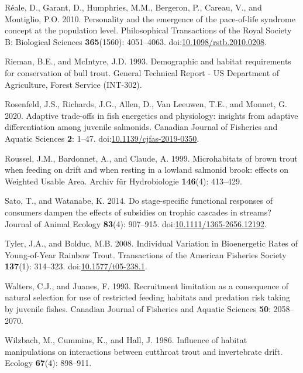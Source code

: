 \documentclass[]{article}
\begin{document}
\hypertarget{ref-Reale2010}{}
Réale, D., Garant, D., Humphries, M.M., Bergeron, P., Careau, V., and
Montiglio, P.O. 2010. Personality and the emergence of the pace-of-life
syndrome concept at the population level. Philosophical Transactions of
the Royal Society B: Biological Sciences \textbf{365}(1560): 4051--4063.
doi:\href{https://doi.org/10.1098/rstb.2010.0208}{10.1098/rstb.2010.0208}.

\hypertarget{ref-Rieman1993a}{}
Rieman, B.E., and McIntyre, J.D. 1993. Demographic and habitat
requirements for conservation of bull trout. General Technical Report -
US Department of Agriculture, Forest Service (INT-302).

\hypertarget{ref-Rosenfeld2020}{}
Rosenfeld, J.S., Richards, J.G., Allen, D., Van Leeuwen, T.E., and
Monnet, G. 2020. Adaptive trade-offs in fish energetics and physiology:
insights from adaptive differentiation among juvenile salmonids.
Canadian Journal of Fisheries and Aquatic Sciences \textbf{2}: 1--47.
doi:\href{https://doi.org/10.1139/cjfas-2019-0350}{10.1139/cjfas-2019-0350}.

\hypertarget{ref-Roussel1999}{}
Roussel, J.M., Bardonnet, A., and Claude, A. 1999. Microhabitats of
brown trout when feeding on drift and when resting in a lowland salmonid
brook: effects on Weighted Usable Area. Archiv für Hydrobiologie
\textbf{146}(4): 413--429.

\hypertarget{ref-Sato2014}{}
Sato, T., and Watanabe, K. 2014. Do stage-specific functional responses
of consumers dampen the effects of subsidies on trophic cascades in
streams? Journal of Animal Ecology \textbf{83}(4): 907--915.
doi:\href{https://doi.org/10.1111/1365-2656.12192}{10.1111/1365-2656.12192}.

\hypertarget{ref-Tyler2008}{}
Tyler, J.A., and Bolduc, M.B. 2008. Individual Variation in Bioenergetic
Rates of Young-of-Year Rainbow Trout. Transactions of the American
Fisheries Society \textbf{137}(1): 314--323.
doi:\href{https://doi.org/10.1577/t05-238.1}{10.1577/t05-238.1}.

\hypertarget{ref-Walters1993a}{}
Walters, C.J., and Juanes, F. 1993. Recruitment limitation as a
consequence of natural selection for use of restricted feeding habitats
and predation risk taking by juvenile fishes. Canadian Journal of
Fisheries and Aquatic Sciences \textbf{50}: 2058--2070.

\hypertarget{ref-Wilzbach1986a}{}
Wilzbach, M., Cummins, K., and Hall, J. 1986. Influence of habitat
manipulations on interactions between cutthroat trout and invertebrate
drift. Ecology \textbf{67}(4): 898--911.
\end{document}
